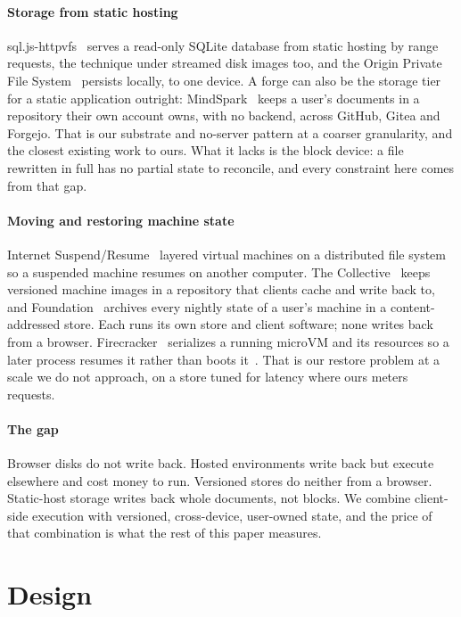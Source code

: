 \documentclass[journal,10pt]{IEEEtran}
\begin{document}
\paragraph{Storage from static hosting}
sql.js-httpvfs~\cite{httpvfs} serves a read-only SQLite database from static
hosting by range requests, the technique under streamed disk images too, and
the Origin Private File System~\cite{opfs} persists locally, to one device. A
forge can also be the storage tier for a static application outright:
MindSpark~\cite{mindspark} keeps a user's documents in a repository their own
account owns, with no backend, across GitHub, Gitea and Forgejo. That is our
substrate and no-server pattern at a coarser granularity, and the closest
existing work to ours. What it lacks is the block device: a file rewritten in
full has no partial state to reconcile, and every constraint here comes from
that gap.

\paragraph{Moving and restoring machine state}
Internet Suspend/Resume~\cite{isr} layered virtual machines on a distributed
file system so a suspended machine resumes on another computer. The
Collective~\cite{collective} keeps versioned machine images in a repository
that clients cache and write back to, and Foundation~\cite{foundation} archives
every nightly state of a user's machine in a content-addressed store. Each runs
its own store and client software; none writes back from a browser.
Firecracker~\cite{firecracker} serializes a running microVM and its resources so
a later process resumes it rather than boots it~\cite{fcsnap}. That is our restore problem at a
scale we do not approach, on a store tuned for latency where ours meters requests.

\paragraph{The gap}
Browser disks do not write back. Hosted environments write back but execute
elsewhere and cost money to run. Versioned stores do neither from a browser.
Static-host storage writes back whole documents, not blocks. We combine client-side execution with
versioned, cross-device, user-owned state, and the price of that combination is
what the rest of this paper measures.

\section{Design}
\label{sec:design}
\end{document}
